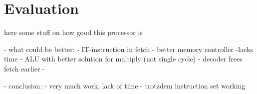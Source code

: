 \chapter{Evaluation}
\label{cha:evaluation}

here some stuff on how good this processor is

- what could be better:
  - IT-instruction in fetch
  - better memory controller -lacks time
  - ALU with better solution for multiply (not single cycle)
  - decoder frees fetch earlier
  - 
  
- conclusion:
  - very much work, lack of time
  - trotzdem instruction set working
  